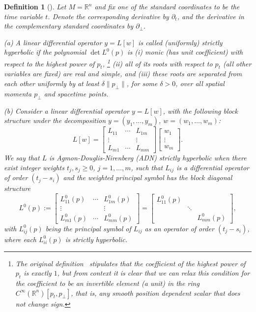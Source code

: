 \documentclass[a4paper]{article}
\newtheorem{dfn}[thm]{Definition}
\theoremstyle{remark}
\newcommand{\del}{\partial}
\newcommand{\oo}{\infty}
\begin{document}
\begin{dfn}[{\cite[\textsection\textsection I.2.2, II.4.1, II.7.2.1]{gv-mixed}}]
\label{dfn:strictly-hyper}
Let $M = \mathbb{R}^n$ and fix one of the standard coordinates to be the
time variable $t$. Denote the corresponding derivative by $\del_t$,
and the derivative in the complementary standard coordinates by $\del_\perp$.

(a) A linear differential operator $y = L[w]$ is called
\emph{(uniformly) strictly hyperbolic} if the polynomial
$\det L^0(p)$ is (i) monic (has unit coefficient) with respect to the
highest power of $p_t$,%
	\footnote{The original definition~\cite[\textsection I.2.2]{gv-mixed} stipulates that the coefficient of the highest power of $p_t$ is exactly $1$, but from context it is clear that we can relax this condition for the coefficient to be an invertible element (a \emph{unit}) in the ring $C^\oo(\mathbb{R}^n)[p_t,p_\perp]$, that is, any smooth position dependent scalar that does not change sign.} %
(ii) all of its roots with respect to $p_t$
(all other variables are fixed) are real and simple, and (iii) these
roots are separated from each other uniformly by at least $\delta
\|p_\perp\|$, for some $\delta > 0$, over all spatial momenta
$p_\perp$ and spacetime points.

(b) Consider a linear differential operator $y = L[w]$, with the following
block structure under the decomposition $y = (y_1,\dots,y_m)$, $w =
(w_1,\dots,w_m)$:
\begin{equation}
	L[w] = \begin{bmatrix}
			L_{11} & \cdots & L_{1m} \\
			\vdots & & \vdots \\
			L_{m1} & \cdots & L_{mm}
		\end{bmatrix}
		\begin{bmatrix}
			w_1 \\ \vdots \\ w_m
		\end{bmatrix}
	.
\end{equation}
We say that $L$ is \emph{Agmon-Douglis-Nirenberg (ADN) strictly
hyperbolic} when there exist integer \emph{weights} $t_j, s_j \ge 0$, $j=1,\ldots,m$,
such that $L_{ij}$ is a differential operator of order $(t_j-s_i)$ and
the \emph{weighted principal symbol} has the block diagonal structure
\begin{equation}
	L^0(p) := \begin{bmatrix}
			L_{11}^0(p) & \cdots & L_{1m}^0(p) \\
			\vdots & & \vdots \\
			L_{m1}^0(p) & \cdots & L_{mm}^0(p)
		\end{bmatrix}
		= \begin{bmatrix}
			L_{11}^0(p) & & \\
			& \ddots & \\
			& & L_{mm}^0(p)
		\end{bmatrix}
	,
\end{equation}
with $L_{ij}^0(p)$ being the principal symbol of $L_{ij}$ as an operator
of order $(t_j-s_i)$, where each $L_{ii}^0(p)$ is strictly hyperbolic.
\end{dfn}
\end{document}
